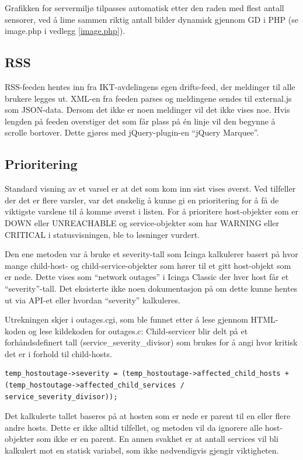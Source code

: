 Grafikken for servermiljø tilpasses automatisk etter den raden med flest antall sensorer, ved å lime sammen riktig antall bilder dynamisk gjennom GD i PHP (se image.php i vedlegg \ref{image.php}).

\subsection{RSS}
RSS-feeden hentes inn fra IKT-avdelingens egen drifts-feed, der meldinger til alle brukere legges ut. XML-en fra feeden parses og meldingene sendes til external.js som JSON-data. Dersom det ikke er noen meldinger vil det ikke vises noe. Hvis lengden på feeden overstiger det som får plass på én linje vil den begynne å scrolle bortover. Dette gjøres med jQuery-plugin-en ``jQuery Marquee''\cite{jqmarquee}.

\subsection{Prioritering}
Standard visning av et varsel er at det som kom inn sist vises øverst. Ved tilfeller der det er flere varsler, var det ønskelig å kunne gi en prioritering for å få de viktigste varslene til å komme øverst i listen. For å prioritere host-objekter som er DOWN eller UNREACHABLE og service-objekter som har WARNING eller CRITICAL i statusvisningen, ble to løsninger vurdert. 

Den ene metoden var å bruke et severity-tall som Icinga kalkulerer basert på hvor mange child-host- og child-service-objekter som hører til et gitt host-objekt som er nede. Dette vises som ``network outages'' i Icinga Classic der hver host får et ``severity''-tall. Det eksisterte ikke noen dokumentasjon på om dette kunne hentes ut via API-et eller hvordan ``severity'' kalkuleres. 

Utrekningen skjer i outages.cgi, som ble funnet etter å lese gjennom HTML-koden og lese kildekoden for outages.c\cite{dnsmichi}:
Child-servicer blir delt på et forhåndsdefinert tall (service\_severity\_divisor) som brukes for å angi hvor kritisk det er i forhold til child-hosts.

\begin{lstlisting}[style=example]
temp_hostoutage->severity = (temp_hostoutage->affected_child_hosts + (temp_hostoutage->affected_child_services / service_severity_divisor));
\end{lstlisting}

Det kalkulerte tallet baseres på at hosten som er nede er parent til en eller flere andre hosts. Dette er ikke alltid tilfellet, og metoden vil da ignorere alle host-objekter som ikke er en parent. En annen svakhet er at antall services vil bli kalkulert mot en statisk variabel, som ikke nødvendigvis gjengir viktigheten.

